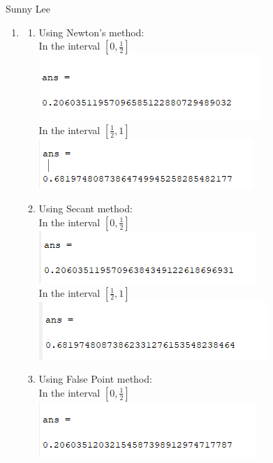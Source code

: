 \documentclass[12pt,letterpaper]{article}
\begin{document}
Sunny Lee

\begin{enumerate}
    \item 
    \begin{enumerate}
        \item 
        Using Newton's method: \\
        In the interval $[0, \frac{1}{2}]$\\
        \includegraphics{number1aa.png}\\
        In the interval $[\frac{1}{2}, 1]$\\
        \includegraphics{number1ab.png}
        \item
        Using Secant method: \\
        In the interval $[0, \frac{1}{2}]$\\
        \includegraphics{number1ba.png}\\
        In the interval $[\frac{1}{2}, 1]$\\
        \includegraphics{number1bb.png}
        \item
        Using False Point method: \\
        In the interval $[0, \frac{1}{2}]$\\
        \includegraphics{number1cb.png}\\

\end{enumerate}
\end{enumerate}
\end{document}
